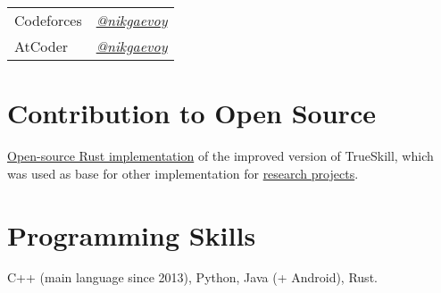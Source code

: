 \documentclass[a4paper, 11pt]{article}
\begin{document}
\begin{tabular}{ll}
	Codeforces & \href{https://codeforces.com/profile/nikgaevoy}{{\it @nikgaevoy}} \\
	AtCoder & \href{https://atcoder.jp/users/nikgaevoy}{{\it @nikgaevoy}}
\end{tabular}

\section*{Contribution to Open Source}

\href{https://github.com/nikgaevoy/SPbTrueSkill}{Open-source Rust implementation} of the improved version of TrueSkill, which was used as base for other implementation for \href{https://arxiv.org/abs/2101.00400}{research projects}.

\section*{Programming Skills}

C++ (main language since 2013), Python, Java (+ Android), Rust.
\end{document}
